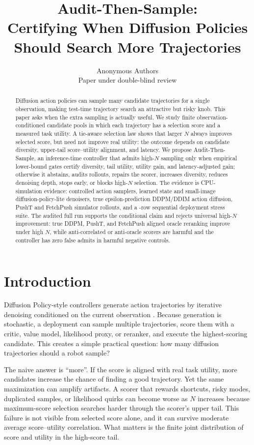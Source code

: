 \documentclass{article}
\title{Audit-Then-Sample:\\
Certifying When Diffusion Policies Should Search More Trajectories}
\author{Anonymous Authors\\Paper under double-blind review}
\newcommand{\ats}{Audit-Then-Sample}
\begin{document}
\maketitle

\begin{abstract}
Diffusion action policies can sample many candidate trajectories for a single observation, making test-time trajectory search an attractive but risky knob. This paper asks when the extra sampling is actually useful. We study finite observation-conditioned candidate pools in which each trajectory has a selection score and a measured task utility. A tie-aware selection law shows that larger $N$ always improves selected score, but need not improve real utility: the outcome depends on candidate diversity, upper-tail score--utility alignment, and latency. We propose \ats{}, an inference-time controller that admits high-$N$ sampling only when empirical lower-bound gates certify diversity, tail utility, utility gain, and latency-adjusted gain; otherwise it abstains, audits rollouts, repairs the scorer, increases diversity, reduces denoising depth, stops early, or blocks high-$N$ selection. The evidence is CPU-simulation evidence: controlled action samplers, learned state and small-image diffusion-policy-lite denoisers, true epsilon-prediction DDPM/DDIM action diffusion, PushT and FetchPush simulator rollouts, and a \AtsDeployStressRows-row sequential deployment stress suite. The audited full run supports the conditional claim and rejects universal high-$N$ improvement: true DDPM, PushT, and FetchPush aligned oracle reranking improve under high $N$, while anti-correlated or anti-oracle scorers are harmful and the controller has zero false admits in harmful negative controls.
\end{abstract}

\section{Introduction}

Diffusion Policy-style controllers generate action trajectories by iterative denoising conditioned on the current observation \citep{chi2023diffusionpolicy,ho2020ddpm,song2020ddim}. Because generation is stochastic, a deployment can sample multiple trajectories, score them with a critic, value model, likelihood proxy, or reranker, and execute the highest-scoring candidate. This creates a simple practical question: how many diffusion trajectories should a robot sample?

The naive answer is ``more''. If the score is aligned with real task utility, more candidates increase the chance of finding a good trajectory. Yet the same maximization can amplify artifacts. A scorer that rewards shortcuts, risky modes, duplicated samples, or likelihood quirks can become worse as $N$ increases because maximum-score selection searches harder through the scorer's upper tail. This failure is not visible from selected score alone, and it can survive moderate average score--utility correlation. What matters is the finite joint distribution of score and utility in the high-score tail.
\end{document}
